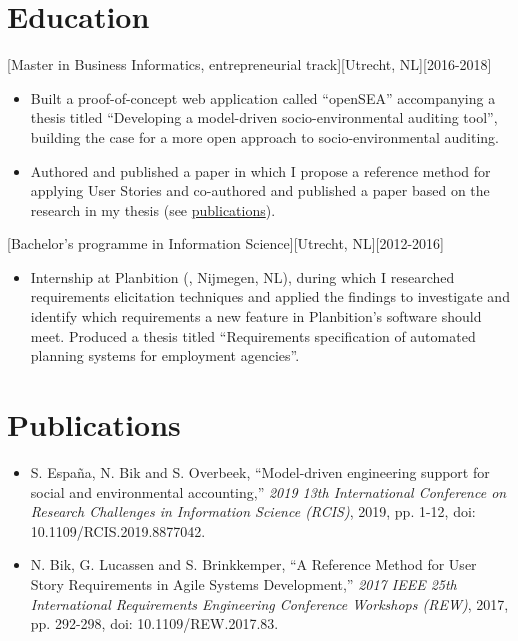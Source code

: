 \documentclass[10pt]{article}
\begin{document}
\section{Education}
\label{sec:school}

[Master in Business Informatics,
      entrepreneurial track][Utrecht, NL][2016-2018]
\begin{itemize}
      \item Built a proof-of-concept web application called \enquote{openSEA}
            accompanying a thesis titled \enquote{Developing a model-driven
                  socio-environmental auditing tool}, building the case for a more open approach
            to socio-environmental auditing.
      \item Authored and published a paper in which I propose a reference method for
            applying User Stories and co-authored and published a paper based on the
            research in my thesis (see \hyperref[sec:pubs]{publications}).
\end{itemize}

[Bachelor's programme in Information
      Science][Utrecht, NL][2012-2016]
\begin{itemize}
      \item Internship at Planbition (, Nijmegen, NL), during
            which I researched requirements elicitation techniques and applied the findings
            to investigate and identify which requirements a new feature in Planbition's
            software should meet. Produced a thesis titled \enquote{Requirements
                  specification of automated planning systems for employment agencies}.
\end{itemize}

\section{Publications}
\label{sec:pubs}

\begin{itemize}
      \item S. España, N. Bik and S. Overbeek, \enquote{Model-driven engineering
                  support for social and environmental accounting,} \textit{2019 13th
                  International Conference on Research Challenges in Information Science (RCIS)},
            2019, pp. 1-12, doi:\\ 10.1109/RCIS.2019.8877042.
      \item N. Bik, G. Lucassen and S. Brinkkemper, \enquote{A Reference Method for
                  User Story Requirements in Agile Systems Development,} \textit{2017 IEEE 25th
                  International Requirements Engineering Conference Workshops (REW)}, 2017, pp.
            292-298, doi: 10.1109/REW.2017.83.
\end{itemize}
\end{document}
